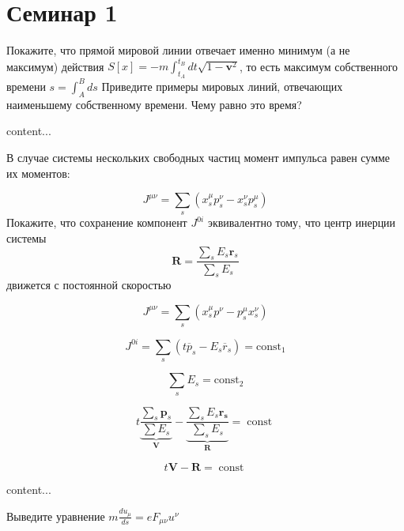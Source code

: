 
\section{Семинар 1}

\begin{problem}
	Покажите, что прямой мировой линии отвечает именно минимум (а не максимум) действия $S[x]=-m \int_{t_{A}}^{t_{B}} d t \sqrt{1-\boldsymbol{v}^{2}}$,
	то есть максимум собственного времени $s=\int_{A}^{B} d s$ Приведите примеры мировых линий, отвечающих
	наименьшему собственному времени. Чему равно это время?
\end{problem}	

\begin{solution}
	content...
\end{solution}




\begin{problem}
В случае системы нескольких свободных частиц момент импульса равен сумме их моментов:

$$
J^{\mu \nu}=\sum_{s}\left(x_{s}^{\mu} p_{s}^{\nu}-x_{s}^{\nu} p_{s}^{\mu}\right)
$$
Покажите, что сохранение компонент $ J^{0 i} $ 
эквивалентно тому, что центр инерции системы
$$
\boldsymbol{R}=\frac{\sum_{s} E_{s} \boldsymbol{r}_{s}}{\sum_{s} E_{s}}
$$
движется с постоянной скоростью
\end{problem}
\begin{solution}
	$$
	J^{\mu \nu}=\sum_{s}\left(x_{s}^{\mu} p^{\nu}-p_{s}^{\mu} x_{s}^{\nu}\right)
	$$
	
	$$
	J^{0 i}=\sum_{s}\left(t \overline{p}_{s}-E_{s} \overline{r}_{s}\right)=\operatorname{const_1}
	$$
	
	$$
	\sum_{s} E_{s}=\operatorname{const_2}
	$$
	
	$$
	t \underbrace{\frac{\sum_{s} \boldsymbol{p}_{s}}{\sum E_{s}}}_{\boldsymbol{V}}-\underbrace{\frac{\sum_{s} E_{s} \boldsymbol{r_{s}}}{\sum_s E_{s}}}_{\boldsymbol{R}}= \operatorname{const}
	$$
	
	
	$$
	t \boldsymbol{V}-\boldsymbol{R}=\operatorname{const}
	$$
	
\end{solution}
\begin{problem}
	content...
\end{problem}



\begin{problem}
	Выведите уравнение $ m \frac{d u_{\mu}}{d s} = e F_{\mu \nu} u^\nu$
	
\end{problem}	


